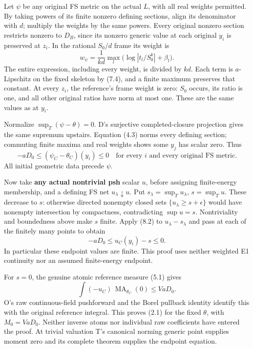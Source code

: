 \documentclass[
  11pt,
]{article}
\begin{document}
Let \(\psi\) be any original FS metric on the actual \(L\), with all
real weights permitted. By taking powers of its finite nonzero defining
sections, align its denominator with \(d\); multiply the weights by the
same powers. Every original nonzero section restricts nonzero to
\(D_B\), since its nonzero generic value at each original \(y_i\) is
preserved at \(z_i\). In the rational \(S_0/d\) frame its weight is \[
 w_\psi=\frac1{kd}\max_l\bigl(\log|t_l/S_0^k|+\beta_l\bigr). \tag{8.1}
\] The entire expression, including every weight, is divided by \(kd\).
Each term is \(a\)-Lipschitz on the fixed skeleton by (7.4), and a
finite maximum preserves that constant. At every \(z_i\), the
reference's frame weight is zero: \(S_0\) occurs, its ratio is one, and
all other original ratios have norm at most one. These are the same
values as at \(y_i\).

Normalize \(\sup_T(\psi-\theta)=0\). D's surjective completed-closure
projection gives the same supremum upstairs. Equation (4.3) norms every
defining section; commuting finite maxima and real weights shows some
\(y_j\) has scalar zero. Thus \[
 -aD_0\leq(\psi_C-\theta_C)(y_i)\leq0
 \quad\text{for every }i\text{ and every original FS metric}. \tag{8.2}
\] All initial geometric data precede \(\psi\).

Now take \textbf{any actual nontrivial psh} scalar \(u\), before
assigning finite-energy membership, and a defining FS net
\(u_\lambda\downarrow u\). Put \(s_\lambda=\sup_Tu_\lambda\),
\(s=\sup_Tu\). These decrease to \(s\): otherwise directed nonempty
closed sets \(\{u_\lambda\geq s+\epsilon\}\) would have nonempty
intersection by compactness, contradicting \(\sup u=s\). Nontriviality
and boundedness above make \(s\) finite. Apply (8.2) to
\(u_\lambda-s_\lambda\) and pass at each of the finitely many points to
obtain \[
 -aD_0\leq u_C(y_i)-s\leq0. \tag{8.3}
\] In particular these endpoint values are finite. This proof uses
neither weighted E1 continuity nor an assumed finite-energy endpoint.

For \(s=0\), the genuine atomic reference measure (5.1) gives \[
 \int(-u_C)\,\operatorname{MA}_{\theta_C}(0)
       \leq VaD_0.
\] O's raw continuous-field pushforward and the Borel pullback identity
identify this with the original reference integral. This proves (2.1)
for the fixed \(\theta\), with \(M_0=VaD_0\). Neither inverse atoms nor
individual raw coefficients have entered the proof. At trivial valuation
T's canonical norming generic point supplies moment zero and its
complete theorem supplies the endpoint equation.
\end{document}
